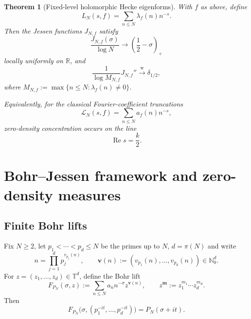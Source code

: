 \documentclass[11pt]{article}
\newtheorem{theorem}{Theorem}[section]
\theoremstyle{definition}
\newcommand{\R}{\mathbb R}
\newcommand{\N}{\mathbb N}
\newcommand{\T}{\mathbb T}
\newcommand{\Ree}{\operatorname{Re}}
\newcommand{\1}{\mathbf 1}
\begin{document}
\begin{theorem}[Fixed-level holomorphic Hecke eigenforms]\label{thm:modular-intro}
With $f$ as above, define
\begin{equation}\label{eq:automorphic-partial-intro}
L_N(s,f)=\sum_{n\le N}\lambda_f(n)n^{-s}.
\end{equation}
Then the Jessen functions $J_{N,f}$ satisfy
\begin{equation}\label{eq:modular-potential-intro}
\frac{J_{N,f}(\sigma)}{\log N}
\longrightarrow
\left(\frac12-\sigma\right)_+
\end{equation}
locally uniformly on $\R$, and
\begin{equation}\label{eq:modular-measure-intro}
\frac1{\log M_{N,f}}J_{N,f}''
\xrightarrow{\mathrm w}\delta_{1/2},
\end{equation}
where $M_{N,f}:=\max\{n\le N:\lambda_f(n)\neq0\}$.

Equivalently, for the classical Fourier-coefficient truncations
\begin{equation}\label{eq:classical-modular-intro}
\mathcal L_N(s,f)=\sum_{n\le N}a_f(n)n^{-s},
\end{equation}
zero-density concentration occurs on the line
\begin{equation}\label{eq:kover2-intro}
\Ree s=\frac{k}{2}.
\end{equation}
\end{theorem}

\section{Bohr--Jessen framework and zero-density measures}\label{sec:bohr-jessen}

\subsection{Finite Bohr lifts}

Fix $N\ge2$, let $p_1<\cdots<p_d\le N$ be the primes up to $N$, $d=\pi(N)$ and write
\begin{equation}\label{eq:prime-factorization}
n=\prod_{j=1}^d p_j^{v_{p_j}(n)},
\qquad
\mathbf v(n):=(v_{p_1}(n),\ldots,v_{p_d}(n))\in\N_0^d.
\end{equation}
For $z=(z_1,\ldots,z_d)\in\T^d$, define the Bohr lift
\begin{equation}\label{eq:bohr-lift-general}
F_{P_N}(\sigma,z)
:=
\sum_{n\le N}a_n n^{-\sigma}z^{\mathbf v(n)},
\qquad
z^{\mathbf m}:=z_1^{m_1}\cdots z_d^{m_d}.
\end{equation}
Then
\begin{equation}\label{eq:vertical-restriction}
F_{P_N}\bigl(\sigma,(p_1^{-it},\ldots,p_d^{-it})\bigr)
=P_N(\sigma+it).
\end{equation}
\end{document}
